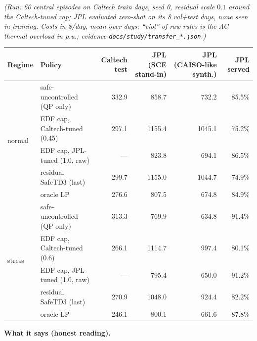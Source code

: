 
\emph{(Run: 60 central episodes on Caltech train days, seed 0, residual scale $0.1$ around the Caltech-tuned cap; JPL evaluated zero-shot on its 8 val+test days, none seen in training. Costs in \$/day, mean over days; ``viol'' of raw rules is the AC thermal overload in p.u.; evidence \texttt{docs/study/transfer\_*.json}.)}

\begin{center}\small
\begin{tabular}{@{}llrrrr@{}}
\toprule Regime & Policy & Caltech test & JPL (SCE stand-in) & JPL (CAISO-like synth.) & JPL served\\\midrule
\multirow{5}{*}{normal} & safe-uncontrolled (QP only) & 332.9 & 858.7 & 732.2 & 85.5\%\\
 & EDF cap, Caltech-tuned (0.45) & 297.1 & 1155.4 & 1045.1 & 75.2\%\\
 & EDF cap, JPL-tuned (1.0, raw) & --- & 823.8 & 694.1 & 86.5\%\\
 & residual SafeTD3 (last) & 299.7 & 1155.0 & 1044.7 & 74.9\%\\
 & oracle LP & 276.6 & 807.5 & 674.8 & 84.9\%\\\midrule
\multirow{5}{*}{stress} & safe-uncontrolled (QP only) & 313.3 & 769.9 & 634.8 & 91.4\%\\
 & EDF cap, Caltech-tuned (0.6) & 266.1 & 1114.7 & 997.4 & 80.1\%\\
 & EDF cap, JPL-tuned (1.0, raw) & --- & 795.4 & 650.0 & 91.2\%\\
 & residual SafeTD3 (last) & 270.9 & 1048.0 & 924.4 & 82.2\%\\
 & oracle LP & 246.1 & 800.1 & 661.6 & 87.8\%\\
\bottomrule\end{tabular}\end{center}
\noindent\textbf{What it says (honest reading).}
